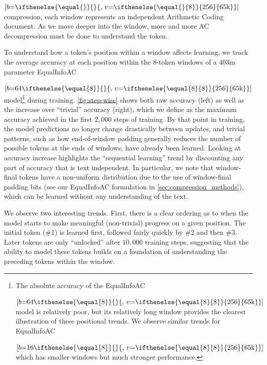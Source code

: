   {$[b\mathord{=}\ifthenelse{\equal{}}{}{,\,v\mathord{=}\ifthenelse{\equal{}{8}}{256}{65\text{k}}}]$} compression, each window represents an independent Arithmetic Coding document. As we move deeper into the window, more and more AC decompression must be done to understand the token.

To understand how a token's position within a window affects learning, we track the average accuracy at each position within the $8$-token windows of a $403$m parameter EqualInfoAC

  {$[b\mathord{=}64\ifthenelse{\equal{8}}{}{,\,v\mathord{=}\ifthenelse{\equal{8}{8}}{256}{65\text{k}}}]$} model\footnote{The absolute accuracy of the EqualInfoAC

  {$[b\mathord{=}64\ifthenelse{\equal{8}}{}{,\,v\mathord{=}\ifthenelse{\equal{8}{8}}{256}{65\text{k}}}]$} model is relatively poor, but its relatively long window provides the clearest illustration of these positional trends. We observe similar trends for EqualInfoAC

  {$[b\mathord{=}16\ifthenelse{\equal{8}}{}{,\,v\mathord{=}\ifthenelse{\equal{8}{8}}{256}{65\text{k}}}]$} which has smaller windows but much stronger performance.} during training. \ref{fig:step-wise} shows both raw accuracy (left) as well as the increase over ``trivial'' accuracy (right), which we define as the maximum accuracy achieved in the first $2{,}000$ steps of training. By that point in training, the model predictions no longer change drastically between updates, and trivial patterns, such as how end-of-window padding generally reduces the number of possible tokens at the ends of windows, have already been learned. Looking at accuracy increase highlights the ``sequential learning'' trend by discounting any part of accuracy that is text independent. In particular, we note that window-final tokens have a non-uniform distribution due to the use of window-final padding bits (see our EqualInfoAC formulation in \ref{sec:compression_methods}), which can be learned without any understanding of the text.

We observe two interesting trends. First, there is a clear ordering as to when the model starts to make meaningful (non-trivial) progress on a given position. The initial token (\#1) is learned first, followed fairly quickly by \#2 and then \#3. Later tokens are only ``unlocked'' after $10{,}000$ training steps, suggesting that the ability to model these tokens builds on a foundation of understanding the preceding tokens within the window.

